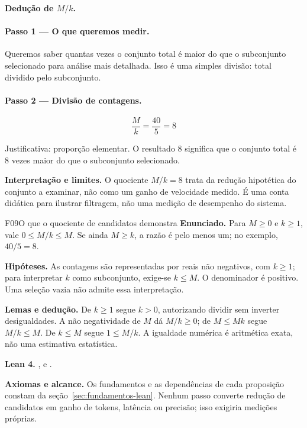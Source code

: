 \begin{metodo}
\textbf{Dedução de $M/k$.}

\paragraph{Passo 1 — O que queremos medir.}
Queremos saber quantas vezes o conjunto total é maior do que o subconjunto selecionado para análise mais detalhada. Isso é uma simples divisão: total dividido pelo subconjunto.

\paragraph{Passo 2 — Divisão de contagens.}

\[
\boxed{\frac{M}{k} = \frac{40}{5} = 8}
\]

Justificativa: proporção elementar. O resultado 8 significa que o conjunto total é 8 vezes maior do que o subconjunto selecionado.
\end{metodo}

\begin{descricao}
\textbf{Interpretação e limites.} O quociente $M/k = 8$ trata da redução hipotética do conjunto a examinar, não como um ganho de velocidade medido. É uma conta didática para ilustrar filtragem, não uma medição de desempenho do sistema.
\end{descricao}

\clearpage
\begin{formalizacao}{F09}{O que o quociente de candidatos demonstra}
\textbf{Enunciado.} Para $M\geq0$ e $k\geq1$, vale $0\leq M/k\leq M$.
Se ainda $M\geq k$, a razão é pelo menos um; no exemplo, $40/5=8$.

\textbf{Hipóteses.} As contagens são representadas por reais não negativos,
com $k\geq1$; para interpretar $k$ como subconjunto, exige-se $k\leq M$.
O denominador é positivo. Uma seleção vazia não admite essa interpretação.

\textbf{Lemas e dedução.} De $k\geq1$ segue $k>0$, autorizando dividir
sem inverter desigualdades. A não negatividade de $M$ dá $M/k\geq0$;
de $M\leq Mk$ segue $M/k\leq M$. De $k\leq M$ segue $1\leq M/k$.
A igualdade numérica é aritmética exata, não uma estimativa estatística.

\textbf{Lean 4.} ,
 e
.

\textbf{Axiomas e alcance.} Os fundamentos e as dependências de cada
proposição constam da seção~\ref{sec:fundamentos-lean}. Nenhum passo
converte redução de candidatos em ganho de tokens, latência ou precisão;
isso exigiria medições próprias.
\end{formalizacao}

